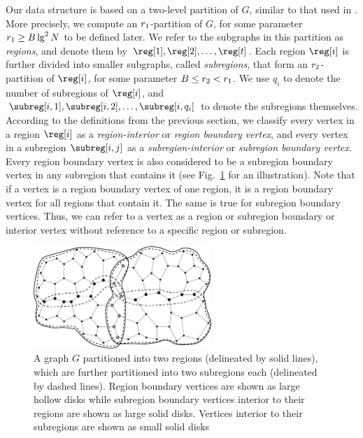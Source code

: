 {Our data structure is based on a two-level partition of $G$, similar to
that used in \cite{DBLP:journals/talg/BoseCHMM12}.
More precisely, we compute an
$r_1$-partition of $G$, for some parameter $r_1 \ge B \lg^2 N$ to be
defined later.
We refer to the subgraphs in this partition as \emph{regions}, and
denote them by $\reg[1], \reg[2], \dots, \reg[t]$.
Each region $\reg[i]$ is further
divided into smaller subgraphs, called \emph{subregions}, that form
an $r_2$-partition of $\reg[i]$, for some parameter
$B \le r_2 < r_1$.
We use $q_i$ to denote the number of subregions of $\reg[i]$, and $\subreg[i,1],
\subreg[i,2], \dots, \subreg[i,q_i]$ to denote the subregions themselves.
According to the definitions from the previous section, we classify
every vertex in a region $\reg[i]$ as a \emph{region-interior} or
\emph{region boundary vertex}, and every vertex in a subregion
$\subreg[i,j]$ as a \emph{subregion-interior} or \emph{subregion boundary
  vertex}.
Every region boundary vertex is also considered to be a
subregion boundary vertex in any subregion that contains it
(see Fig.~\ref{fig:partitioned_graph} for an illustration).
Note that if a vertex is a region boundary vertex of one region, it is a region
boundary vertex for all regions that contain it.
The same is true for subregion boundary vertices.
Thus, we can refer to a vertex as a region or subregion boundary or interior
vertex without reference to a specific region or subregion.

\begin{figure}[t]
  \centering
  \includegraphics[width=0.6\textwidth]{Fig1}
  \caption[Recursively-partitioned graph]{A graph $G$ partitioned into two 
	regions (delineated by solid lines), which are further partitioned into two 
	subregions each (delineated by dashed lines).
    Region boundary vertices are shown as large hollow disks while subregion 
	boundary vertices interior to their regions are shown as large solid disks.
    Vertices interior to their subregions are shown as small solid disks}
  \label{fig:partitioned_graph}
\end{figure}

}

